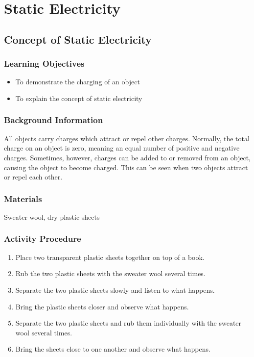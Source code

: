 \section{Static Electricity}

\subsection{Concept of Static Electricity}

\subsubsection*{Learning Objectives}
\begin{itemize}
\item{To demonstrate the charging of an object} 
\item{To explain the concept of static electricity} 
\end{itemize}

\subsubsection*{Background Information}
All objects carry charges which attract or repel other charges. Normally, the total charge on an object is zero, meaning an equal number of positive and negative charges. Sometimes, however, charges can be added to or removed from an object, causing the object to become charged. This can be seen when two objects attract or repel each other.  

\subsubsection*{Materials}
Sweater wool, dry plastic sheets

\subsubsection*{Activity Procedure}
\begin{enumerate}
\item{Place two transparent plastic sheets together on top of a book.}
\item{Rub the two plastic sheets with the sweater wool several times.} 
\item{Separate the two plastic sheets slowly and listen to what happens.} 
\item{Bring the plastic sheets closer and observe what happens.} 
\item{Separate the two plastic sheets and rub them individually with the sweater wool several times.} 
\item{Bring the sheets close to one another and observe what happens.} 
\end{enumerate}

